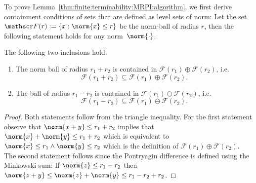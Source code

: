 To prove Lemma~\ref{thm:finite:terminability:MRPI:algorithm}, we first derive containment conditions of 
sets that are defined as level sets of norm:
%
Let the set $\mathscr F(r) := \{x:\norm{x}\leq r\}$ be the norm-ball of radius $r$, then the following statement holds 
for any norm~$\norm{\cdot}$.
% 
\begin{thm}\label{thm:inclusions:norm:balls:sum:difference}
The following two inclusions hold:
\begin{enumerate}
\item 
%
The norm ball of radius $r_1+r_2$ is contained in $\mathscr F(r_1)\oplus \mathscr F(r_2)$, i.e. 
%
\begin{equation}
	\mathscr F(r_1 + r_2)\subseteq \mathscr F(r_1)\oplus \mathscr F(r_2).
\end{equation}
%
\item
%
The ball of radius $r_1-r_2$ is contained in $\mathscr F(r_1)\ominus \mathcal F(r_2)$, i.e.
%
\begin{equation}
	\mathscr F(r_1-r_2)\subseteq \mathscr F(r_1)\ominus \mathscr F(r_2).
\end{equation}
\end{enumerate}
\end{thm}
%
\begin{proof}
%
Both statements follow from the triangle inequality.
%
For the first statement observe that $\norm{x+y}\leq r_1+r_2$ implies that $\norm{x}+\norm{y}\leq r_1+r_2$ which is equivalent to $\norm{x}\leq r_1\wedge\norm{y}\leq r_2$ which is the definition of $\mathscr F(r_1)\oplus \mathcal F(r_2)$.
%
The second statement follows since the Pontryagin difference is defined using the Minkowski sum:
%
If $\norm{z}\leq r_1 -r_2$ then $\norm{z+y}\leq\norm{z}+\norm{y}\leq r_1-r_2+r_2$.
\end{proof}
%
